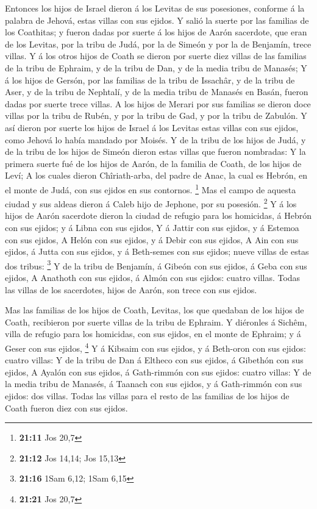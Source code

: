  Entonces los hijos de Israel dieron á los Levitas de sus
posesiones, conforme á la palabra de Jehová, estas villas con sus
ejidos.  Y salió la suerte por las familias de los
Coathitas; y fueron dadas por suerte á los hijos de Aarón sacerdote, que
eran de los Levitas, por la tribu de Judá, por la de Simeón y por la de
Benjamín, trece villas.  Y á los otros hijos de Coath se
dieron por suerte diez villas de las familias de la tribu de Ephraim, y
de la tribu de Dan, y de la media tribu de Manasés;  Y á los
hijos de Gersón, por las familias de la tribu de Issachâr, y de la tribu
de Aser, y de la tribu de Nephtalí, y de la media tribu de Manasés en
Basán, fueron dadas por suerte trece villas.  A los hijos de
Merari por sus familias se dieron doce villas por la tribu de Rubén, y
por la tribu de Gad, y por la tribu de Zabulón.  Y así
dieron por suerte los hijos de Israel á los Levitas estas villas con sus
ejidos, como Jehová lo había mandado por Moisés.  Y de la
tribu de los hijos de Judá, y de la tribu de los hijos de Simeón dieron
estas villas que fueron nombradas:  Y la primera suerte fué
de los hijos de Aarón, de la familia de Coath, de los hijos de Leví;
 A los cuales dieron Chîriath-arba, del padre de Anac, la
cual es Hebrón, en el monte de Judá, con sus ejidos en sus contornos.
\footnote{\textbf{21:11} Jos 20,7}  Mas el campo de aquesta
ciudad y sus aldeas dieron á Caleb hijo de Jephone, por su posesión.
\footnote{\textbf{21:12} Jos 14,14; Jos 15,13}  Y á los
hijos de Aarón sacerdote dieron la ciudad de refugio para los homicidas,
á Hebrón con sus ejidos; y á Libna con sus ejidos,  Y á
Jattir con sus ejidos, y á Estemoa con sus ejidos,  A Helón
con sus ejidos, y á Debir con sus ejidos,  A Ain con sus
ejidos, á Jutta con sus ejidos, y á Beth-semes con sus ejidos; nueve
villas de estas dos tribus: \footnote{\textbf{21:16} 1Sam 6,12; 1Sam
  6,15}  Y de la tribu de Benjamín, á Gibeón con sus
ejidos, á Geba con sus ejidos,  A Anathoth con sus ejidos,
á Almón con sus ejidos: cuatro villas.  Todas las villas de
los sacerdotes, hijos de Aarón, son trece con sus ejidos.

 Mas las familias de los hijos de Coath, Levitas, los que
quedaban de los hijos de Coath, recibieron por suerte villas de la tribu
de Ephraim.  Y diéronles á Sichêm, villa de refugio para
los homicidas, con sus ejidos, en el monte de Ephraim; y á Geser con sus
ejidos, \footnote{\textbf{21:21} Jos 20,7}  Y á Kibsaim con
sus ejidos, y á Beth-oron con sus ejidos: cuatro villas:  Y
de la tribu de Dan á Eltheco con sus ejidos, á Gibethón con sus ejidos,
 A Ayalón con sus ejidos, á Gath-rimmón con sus ejidos:
cuatro villas:  Y de la media tribu de Manasés, á Taanach
con sus ejidos, y á Gath-rimmón con sus ejidos: dos villas.
 Todas las villas para el resto de las familias de los
hijos de Coath fueron diez con sus ejidos.

